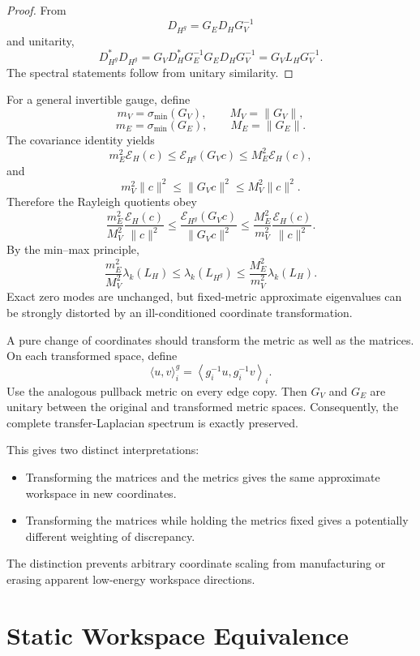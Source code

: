 \begin{proof}
From
\[
D_{H^g}=G_ED_HG_V^{-1}
\]
and unitarity,
\[
D_{H^g}^*D_{H^g}
=
G_VD_H^*G_E^{-1}G_ED_HG_V^{-1}
=
G_VL_HG_V^{-1}.
\]
The spectral statements follow from unitary similarity.
\end{proof}


For a general invertible gauge, define
\[
m_V=\sigma_{\min}(G_V),
\qquad
M_V=\|G_V\|,
\]
\[
m_E=\sigma_{\min}(G_E),
\qquad
M_E=\|G_E\|.
\]
The covariance identity yields
\[
m_E^2\mathcal E_H(c)
\leq
\mathcal E_{H^g}(G_Vc)
\leq
M_E^2\mathcal E_H(c),
\]
and
\[
m_V^2\|c\|^2
\leq
\|G_Vc\|^2
\leq
M_V^2\|c\|^2.
\]
Therefore the Rayleigh quotients obey
\[
\boxed{
\frac{m_E^2}{M_V^2}
\frac{\mathcal E_H(c)}{\|c\|^2}
\leq
\frac{\mathcal E_{H^g}(G_Vc)}{\|G_Vc\|^2}
\leq
\frac{M_E^2}{m_V^2}
\frac{\mathcal E_H(c)}{\|c\|^2}.
}
\]
By the min--max principle,
\[
\boxed{
\frac{m_E^2}{M_V^2}\lambda_k(L_H)
\leq
\lambda_k(L_{H^g})
\leq
\frac{M_E^2}{m_V^2}\lambda_k(L_H).
}
\]
Exact zero modes are unchanged, but fixed-metric approximate eigenvalues can be
strongly distorted by an ill-conditioned coordinate transformation.


A pure change of coordinates should transform the metric as well as the
matrices. On each transformed space, define
\[
\langle u,v\rangle_i^g
=
\left\langle g_i^{-1}u,g_i^{-1}v\right\rangle_i.
\]
Use the analogous pullback metric on every edge copy. Then \(G_V\) and
\(G_E\) are unitary between the original and transformed metric spaces.
Consequently, the complete transfer-Laplacian spectrum is exactly preserved.

This gives two distinct interpretations:
\begin{itemize}
\item Transforming the matrices and the metrics gives the same approximate
workspace in new coordinates.
\item Transforming the matrices while holding the metrics fixed gives a
potentially different weighting of discrepancy.
\end{itemize}
The distinction prevents arbitrary coordinate scaling from manufacturing or
erasing apparent low-energy workspace directions.

\section{Static Workspace Equivalence}

